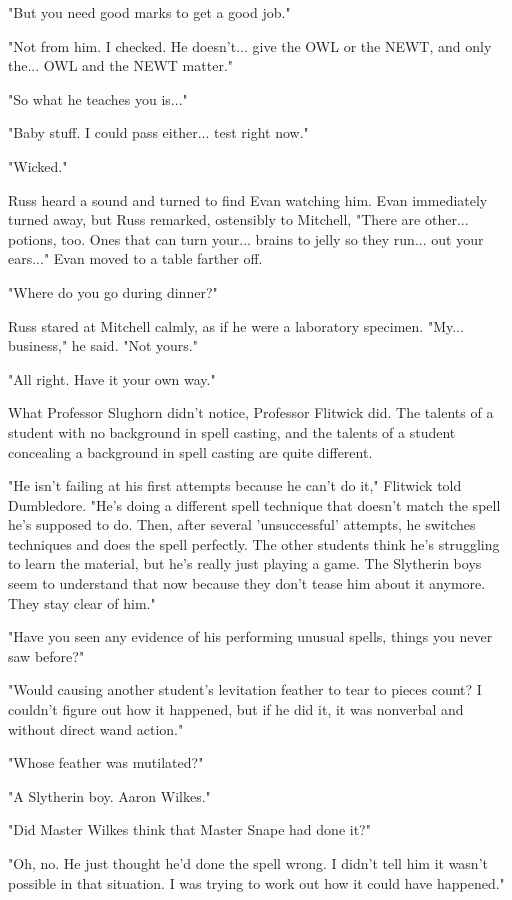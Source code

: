 \documentclass[a4paper,11pt]{article}
\begin{document}
"But you need good marks to get a good job."

"Not from him. I checked. He doesn't... give the OWL or the NEWT, and only the... OWL and the NEWT matter."

"So what he teaches you is..."

"Baby stuff. I could pass either... test right now."

"Wicked."

Russ heard a sound and turned to find Evan watching him. Evan immediately turned away, but Russ remarked, ostensibly to Mitchell, "There are other... potions, too. Ones that can turn your... brains to jelly so they run... out your ears..." Evan moved to a table farther off.

"Where do you go during dinner?"

Russ stared at Mitchell calmly, as if he were a laboratory specimen. "My... business," he said. "Not yours."

"All right. Have it your own way."

What Professor Slughorn didn't notice, Professor Flitwick did. The talents of a student with no background in spell casting, and the talents of a student concealing a background in spell casting are quite different.

"He isn't failing at his first attempts because he can't do it," Flitwick told Dumbledore. "He's doing a different spell technique that doesn't match the spell he's supposed to do. Then, after several 'unsuccessful' attempts, he switches techniques and does the spell perfectly. The other students think he's struggling to learn the material, but he's really just playing a game. The Slytherin boys seem to understand that now because they don't tease him about it anymore. They stay clear of him."

"Have you seen any evidence of his performing unusual spells, things you never saw before?"

"Would causing another student's levitation feather to tear to pieces count? I couldn't figure out how it happened, but if he did it, it was nonverbal and without direct wand action."

"Whose feather was mutilated?"

"A Slytherin boy. Aaron Wilkes."

"Did Master Wilkes think that Master Snape had done it?"

"Oh, no. He just thought he'd done the spell wrong. I didn't tell him it wasn't possible in that situation. I was trying to work out how it could have happened."
\end{document}
